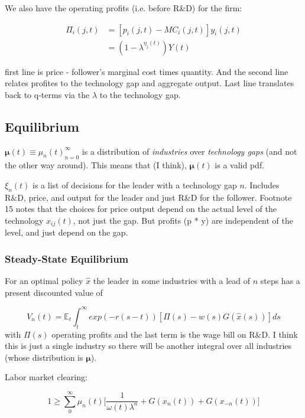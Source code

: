 \documentclass[11pt]{article}
\begin{document}
  We also have the operating profits (i.e. before R\&D) for the firm:
  
  \begin{align*} \label{eq:profits}
    \Pi_i(j, t) &= [p_i(j, t) - MC_i(j, t)]y_i(j, t)\\
                &= (1 - \lambda^{\eta_j(t)})Y(t)
  \end{align*}

  first line is price -  follower's marginal cost times quantity.  And the second line relates profites to the technology gap and aggregate output.  Last line translates back to q-terms via the $\lambda$ to the technology gap.

\subsection{Equilibrium}
\label{sub:equilibrium}
  $\bm{\mu}(t) \equiv {\mu_n(t)}_{n=0}^\infty$ is a distribution of \emph{industries} over \emph{technology gaps} (and not the other way around).  This means that (I think), $\bm{\mu}(t)$ is a valid pdf.

  $\xi_n(t)$ is a list of decisions for the leader with a technology gap $n$.  Includes R\&D, price, and output for the leader and just R\&D for the follower.  Footnote 15 notes that the choices for price output depend on the actual level of the technology $x_{ij}(t)$, not just the gap.  But profits (p * y) are independent of the level, and just depend on the gap.

  \subsubsection{Steady-State Equilibrium}
  \label{subsub:steady_state_equilibrium}
  For an optimal policy $\hat{x}$ the leader in some industries with a lead of $n$ steps has a present discounted value of 

  \begin{equation}
    V_n(t) = \mathbb{E}_t \int_{t}^{\infty} exp(-r(s - t))[\Pi(s) - w(s)G(\hat{x}(s))]ds
  \end{equation}
  with $\Pi(s)$ operating profits and the last term is the wage bill on R\&D.  I think this is just a single industry so there will be another integral over all industries (whose distribution is $\bm{\mu}$).

  Labor market clearing:

  \begin{equation} \label{eq:labor_clearing}
    1 \geq \sum_0^{\infty} \mu_n(t) \Big[\frac{1}{\omega(t)\lambda^n} + G(x_n(t)) + G(x_{-n}(t))\Big]
  \end{equation}
\end{document}
